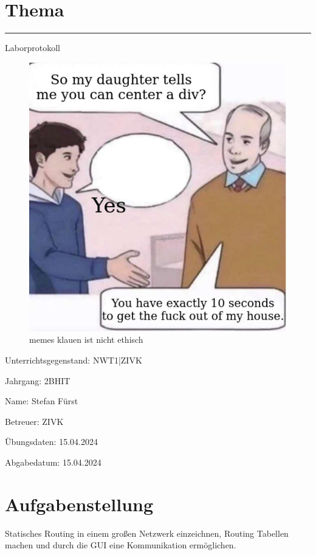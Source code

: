 \documentclass[a4paper]{article}
\begin{document}
\pagestyle{oida}
\section*{Thema}
\par\noindent\rule{\textwidth}{0.4pt}

Laborprotokoll

\begin{figure}[h]
	\includegraphics[scale=0.6]{meme.jpeg}
	\caption{memes klauen ist nicht ethisch}
\end{figure}

\vspace*{\fill}
Unterrichtsgegenstand:	NWT1|ZIVK

Jahrgang:	2BHIT

Name:	Stefan Fürst

Betreuer: 	ZIVK

Übungsdaten:	15.04.2024

Abgabedatum:	15.04.2024


\newpage
\tableofcontents

\newpage

\section{Aufgabenstellung}
Statisches Routing in einem großen Netzwerk einzeichnen, Routing Tabellen machen und durch die GUI eine Kommunikation ermöglichen.
\end{document}
